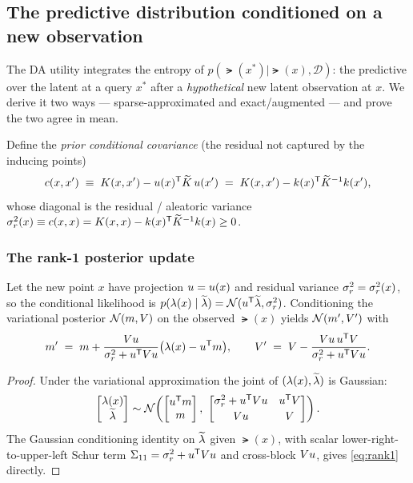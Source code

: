 \subsection{The predictive distribution conditioned on a new observation}
\label{subsec:predictive}

The DA utility integrates the entropy of $p(\lat(x^*)\mid\lat(x),\mathcal{D})$:
the predictive over the latent at a query $x^*$ after a \emph{hypothetical} new
latent observation at $x$. We derive it two ways --- sparse-approximated and
exact/augmented --- and prove the two agree in mean.

Define the \emph{prior conditional covariance} (the residual not captured by the
inducing points)
\[
  c(x,x') \;\equiv\; K(x,x')-u(x)^{\mathsf{T}}\widetilde{K}\,u(x')
                        \;=\; K(x,x')-k(x)^{\mathsf{T}}\widetilde{K}^{-1}k(x'),
\]
whose diagonal is the residual / aleatoric variance
$\sigma_{r}^{2}(x)\equiv c(x,x)=K(x,x)-k(x)^{\mathsf{T}}\widetilde{K}^{-1}k(x)\ge0$.

\subsubsection{The rank-1 posterior update}
\begin{lemma}\label{lem:rank1}
Let the new point $x$ have projection $u=u(x)$ and residual variance
$\sigma_{r}^{2}=\sigma_{r}^{2}(x)$, so the conditional likelihood is
$p(\lambda(x)\mid\widetilde{\lambda})=\mathcal{N}(u^{\mathsf{T}}\widetilde{\lambda},\sigma_{r}^{2})$. Conditioning the
variational posterior $\mathcal{N}(m,V)$ on the observed $\lat(x)$ yields
$\mathcal{N}(m',V')$ with
\begin{equation}\label{eq:rank1}
  m' \;=\; m+\frac{Vu}{\sigma_{r}^{2}+u^{\mathsf{T}}Vu}\bigl(\lambda(x)-u^{\mathsf{T}}m\bigr),
  \qquad
  V' \;=\; V-\frac{Vu\,u^{\mathsf{T}}V}{\sigma_{r}^{2}+u^{\mathsf{T}}Vu}.
\end{equation}
\end{lemma}
\begin{proof}
Under the variational approximation the joint of $(\lambda(x),\widetilde{\lambda})$ is Gaussian:
\[
  \begin{bmatrix}\lambda(x)\\ \widetilde{\lambda}\end{bmatrix}
  \sim\mathcal{N}\!\left(
  \begin{bmatrix}u^{\mathsf{T}}m\\ m\end{bmatrix},\
  \begin{bmatrix}\sigma_{r}^{2}+u^{\mathsf{T}}Vu & u^{\mathsf{T}}V\\[2pt]
                 Vu & V\end{bmatrix}\right).
\]
The Gaussian conditioning identity on $\widetilde{\lambda}$ given $\lat(x)$, with scalar
lower-right-to-upper-left Schur term $\Sigma_{11}=\sigma_{r}^{2}+u^{\mathsf{T}}Vu$ and
cross-block $Vu$, gives \eqref{eq:rank1} directly.
\end{proof}

